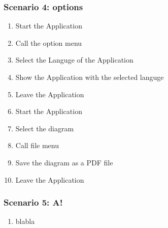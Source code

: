 \subsubsection {Scenario 4: options} 

\begin{enumerate}

\item Start the Application

\item Call the option menu

\item Select the Languge of the Application

\item Show the Application with the selected languge

\item Leave the Application

\item Start the Application 

\item Select the diagram 

\item Call file menu

\item Save the diagram as a PDF file

\item Leave the Application

\end{enumerate}

\subsubsection {Scenario 5: A!} 

\begin{enumerate}

\item blabla

\end{enumerate}
